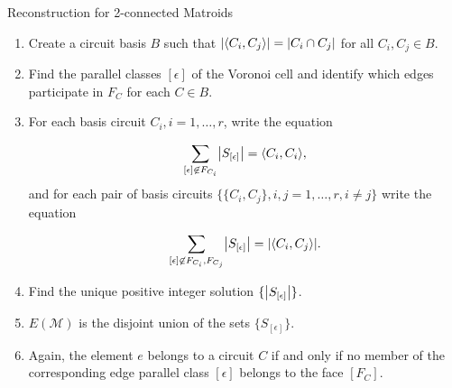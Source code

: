 \documentclass[9pt]{beamer}
\def\calM{\mathcal M}
\DeclarePairedDelimiter\abs{\lvert}{\rvert}
\DeclarePairedDelimiter\iprod{\langle}{\rangle}
\begin{document}
    \begin{frame}{Reconstruction for 2-connected Matroids}
        
        \begin{enumerate}
            \item Create a circuit basis $B$ such that $\abs*{\iprod*{C_i, C_j}}=\abs*{C_i\cap C_j}$ for all $C_i, C_j\in B$.\pause
            \item Find the parallel classes $[\epsilon]$ of the Voronoi cell and identify which edges participate in $F_C$ for each $C\in B$.\pause
            \item For each basis circuit $C_i, i=1, \dots, r$, write the equation

            \[\sum_{[\epsilon]\not\in F_{C_i}} \abs*{S_{[\epsilon]}}=\iprod*{C_i, C_i},\]
            and for each pair of basis circuits $\{\{C_i, C_j\}, i, j=1, \dots, r, i\neq j\}$ write the equation
            
            \[\sum_{[\epsilon]\not\in F_{C_i}, F_{C_j}} \abs*{S_{[\epsilon]}}=\abs*{\iprod*{C_i, C_j}}.\]\pause
            \item Find the unique positive integer solution $\{\abs*{S_{[\epsilon]}}\}$.\pause
            \item $E(\calM)$ is the disjoint union of the sets $\{S_{[\epsilon]}\}$.\pause
            \item Again, the element $e$ belongs to a circuit $C$ if and only if no member of the corresponding edge parallel class $[\epsilon]$ belongs to the face $[F_C]$.
        \end{enumerate}
        
    \end{frame}
\end{document}
